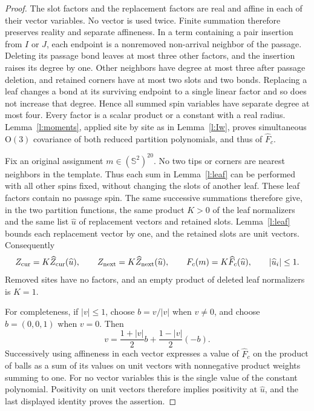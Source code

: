 \begin{proof}
The slot factors and the replacement factors are real and affine
in each of their vector variables.  No vector is used twice.
Finite summation therefore preserves reality and separate
affineness.  In a term containing a pair insertion from \(I\) or
\(J\), each endpoint is a nonremoved non-arrival neighbor of the
passage.  Deleting its passage bond leaves at most three other
factors, and the insertion raises its degree by one.  Other
neighbors have degree at most three after passage deletion, and
retained corners have at most two slots and two bonds.  Replacing
a leaf changes a bond at its surviving endpoint to a single
linear factor and so does not increase that degree.  Hence all
summed spin variables have separate degree at most four.
Every factor is a scalar product or a constant with a real
radius.  Lemma~\ref{l:moments}, applied site by site as in
Lemma~\ref{l:Iw}, proves simultaneous \(\mathrm O(3)\) covariance
of both reduced partition polynomials, and thus of
\(\widehat F_c\).

Fix an original assignment \(m\in(\mathbb S^2)^{20}\).  No two
tips or corners are nearest neighbors in the template.  Thus
each sum in Lemma~\ref{l:leaf} can be performed with all other
spins fixed, without changing the slots of another leaf.  These
leaf factors contain no passage spin.  The same successive
summations therefore give, in the two partition functions, the
same product \(K>0\) of the leaf normalizers and the same list
\(\widehat u\) of replacement vectors and retained slots.
Lemma~\ref{l:leaf} bounds each replacement vector by one, and
the retained slots are unit vectors.  Consequently
\[
 Z_{\rm cur}=K\widehat Z_{\rm cur}(\widehat u),\qquad
 Z_{\rm next}=K\widehat Z_{\rm next}(\widehat u),\qquad
 F_c(m)=K\widehat F_c(\widehat u),\qquad |\widehat u_i|\le1.
\]
Removed sites have no factors, and an empty product of deleted
leaf normalizers is \(K=1\).

For completeness, if \(|v|\le1\), choose \(b=v/|v|\) when
\(v\ne0\), and choose \(b=(0,0,1)\) when \(v=0\).  Then
\[
 v=\frac{1+|v|}{2}b+\frac{1-|v|}{2}(-b).
\]
Successively using affineness in each vector expresses a value
of \(\widehat F_c\) on the product of balls as a sum of its
values on unit vectors with nonnegative product weights summing
to one.  For no vector variables this is the single value of the
constant polynomial.  Positivity on unit vectors therefore
implies positivity at \(\widehat u\), and the last displayed
identity proves the assertion.
\end{proof}

